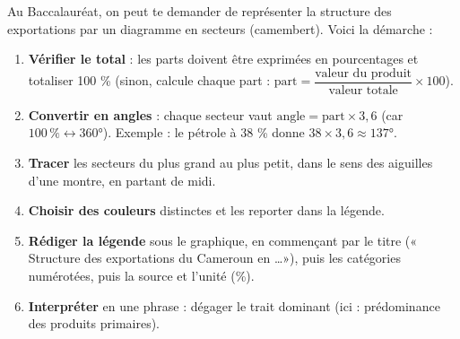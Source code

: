 \documentclass[11pt]{article}
\begin{document}
\begin{methode}
Au Baccalauréat, on peut te demander de représenter la structure des exportations par un diagramme en secteurs (camembert). Voici la démarche :
\begin{enumerate}
\item \textbf{Vérifier le total} : les parts doivent être exprimées en pourcentages et totaliser 100 \% (sinon, calcule chaque part : $\text{part} = \dfrac{\text{valeur du produit}}{\text{valeur totale}} \times 100$).
\item \textbf{Convertir en angles} : chaque secteur vaut $\text{angle} = \text{part} \times 3{,}6$ (car $100\,\% \leftrightarrow 360°$). Exemple : le pétrole à 38 \% donne $38 \times 3{,}6 \approx 137°$.
\item \textbf{Tracer} les secteurs du plus grand au plus petit, dans le sens des aiguilles d'une montre, en partant de midi.
\item \textbf{Choisir des couleurs} distinctes et les reporter dans la légende.
\item \textbf{Rédiger la légende} sous le graphique, en commençant par le titre (« Structure des exportations du Cameroun en \dots »), puis les catégories numérotées, puis la source et l'unité (\%).
\item \textbf{Interpréter} en une phrase : dégager le trait dominant (ici : prédominance des produits primaires).
\end{enumerate}
\end{methode}
\end{document}
